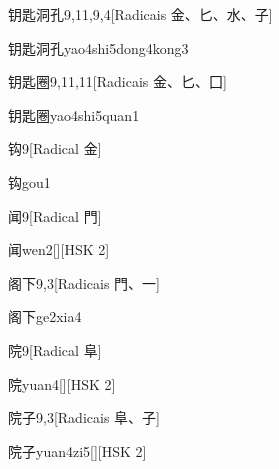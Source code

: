\begin{entry}{钥匙洞孔}{9,11,9,4}[Radicais ⾦、⼔、⽔、⼦]
  \begin{phonetics}{钥匙洞孔}{yao4shi5dong4kong3}
  \end{phonetics}
\end{entry}

\begin{entry}{钥匙圈}{9,11,11}[Radicais ⾦、⼔、⼞]
  \begin{phonetics}{钥匙圈}{yao4shi5quan1}
  \end{phonetics}
\end{entry}

\begin{entry}{钩}{9}[Radical ⾦]
  \begin{phonetics}{钩}{gou1}
  \end{phonetics}
\end{entry}

\begin{entry}{闻}{9}[Radical ⾨]
  \begin{phonetics}{闻}{wen2}[][HSK 2]
  \end{phonetics}
\end{entry}

\begin{entry}{阁下}{9,3}[Radicais ⾨、⼀]
  \begin{phonetics}{阁下}{ge2xia4}
  \end{phonetics}
\end{entry}

\begin{entry}{院}{9}[Radical ⾩]
  \begin{phonetics}{院}{yuan4}[][HSK 2]
  \end{phonetics}
\end{entry}

\begin{entry}{院子}{9,3}[Radicais ⾩、⼦]
  \begin{phonetics}{院子}{yuan4zi5}[][HSK 2]
  \end{phonetics}
\end{entry}

